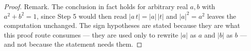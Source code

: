 \begin{proof}
Remark.  The conclusion in fact holds for arbitrary real $a, b$ with
$a^2 + b^2 = 1$, since Step 5 would then read $|a\,t| = |a|\,|t|$ and
$|a|^2 = a^2$ leaves the computation unchanged.  The sign hypotheses are stated
because they are what this proof route consumes --- they are used only to
rewrite $|a|$ as $a$ and $|b|$ as $b$ --- and not because the statement needs
them.
\end{proof}
